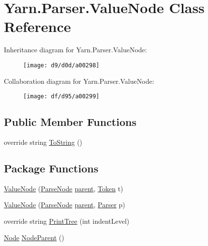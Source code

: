 \hypertarget{a00087}{\section{Yarn.\-Parser.\-Value\-Node Class Reference}
\label{a00087}
}


Inheritance diagram for Yarn.\-Parser.\-Value\-Node\-:
\nopagebreak
\begin{figure}[H]
\begin{center}
\leavevmode
\texttt{[image: d9/d0d/a00298]}
\end{center}
\end{figure}


Collaboration diagram for Yarn.\-Parser.\-Value\-Node\-:
\nopagebreak
\begin{figure}[H]
\begin{center}
\leavevmode
\texttt{[image: df/d95/a00299]}
\end{center}
\end{figure}
\subsection*{Public Member Functions}
\begin{DoxyCompactItemize}
\item 
override string \hyperlink{a00063_a18c67cb16090d0889bb9d6c8c6c565f8}{To\-String} ()
\end{DoxyCompactItemize}
\subsection*{Package Functions}
\begin{DoxyCompactItemize}
\item 
\hyperlink{a00087_a4d2911dde809291a8615262b9b0b4b46}{Value\-Node} (\hyperlink{a00063}{Parse\-Node} \hyperlink{a00063_af313a82103fcc2ff5a177dbb06b92f7b}{parent}, \hyperlink{a00079}{Token} t)
\item 
\hyperlink{a00087_ac63fbe99131dc3b42af16a2d087c0655}{Value\-Node} (\hyperlink{a00063}{Parse\-Node} \hyperlink{a00063_af313a82103fcc2ff5a177dbb06b92f7b}{parent}, \hyperlink{a00064}{Parser} p)
\item 
override string \hyperlink{a00087_ae4659e4431e9846a45e0d048c960781a}{Print\-Tree} (int indent\-Level)
\item 
\hyperlink{a00054}{Node} \hyperlink{a00063_a580e520a29444fc23ac3660cbe514a09}{Node\-Parent} ()
\end{DoxyCompactItemize}
